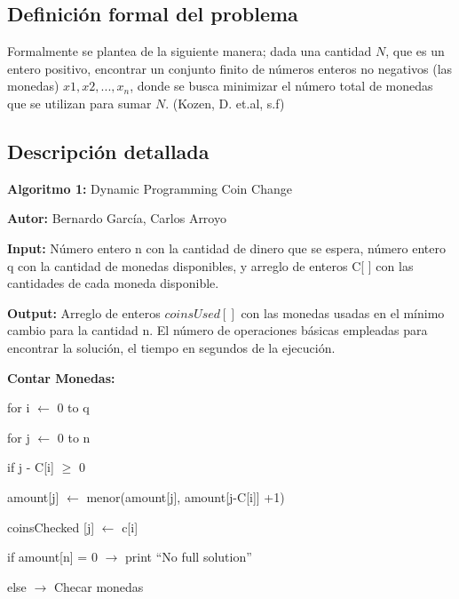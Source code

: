 \documentclass[12pt,letterpaper, titlepage, onecolumn]{article}
\begin{document}
\pagebreak	

\subsection{Definición formal del problema}
\par\indent Formalmente se plantea de la siguiente manera; dada una cantidad $N$, que es un entero 
positivo, encontrar un conjunto finito de números enteros no negativos (las monedas) 
${x1, x2, ..., x_n}$, donde se busca minimizar el número total de monedas que se utilizan 
para sumar $N$. (Kozen, D. et.al, s.f)

\subsection{Descripción detallada}
\textbf{Algoritmo 1:} Dynamic Programming Coin Change
\par\textbf{Autor:} Bernardo García, Carlos Arroyo
\par\textbf{Input:} Número entero n con la cantidad de dinero que se espera, número entero q con la cantidad de monedas disponibles, y arreglo de enteros C[ ] con las cantidades de cada moneda disponible. 
\par\textbf{Output:} Arreglo de enteros $coinsUsed[ ]$ con las monedas usadas en el mínimo cambio para la cantidad n.  El número de operaciones básicas empleadas para encontrar la solución, el tiempo en segundos de la ejecución.
\\
\par\textbf{Contar Monedas:}
		\par\indent for i $\leftarrow$ 0 to q
		\par\indent\indent for j $\leftarrow$ 0 to n
		\par\indent\indent\indent if j - C[i] $\ge$ 0
		\par\indent\indent\indent\indent amount[j] $\leftarrow$ menor(amount[j], amount[j-C[i]] +1)
		\par\indent\indent\indent\indent coinsChecked [j] $\leftarrow$ c[i]


		\par\indent if amount[n] = 0 $\rightarrow$  print “No full solution”
		\par\indent else $\rightarrow$ Checar monedas
	
\end{document}
